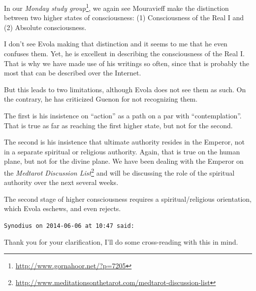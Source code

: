 \begin{footnotesize}
\begin{sffamily}
In our \textit{Monday study group}\footnote{\url{http://www.gornahoor.net/?p=7205}}, we again see Mouravieff make the distinction between two higher states of consciousness: (1) Consciousness of the Real I and (2) Absolute consciousness.

I don't see Evola making that distinction and it seems to me that he even confuses them. Yet, he is excellent in describing the consciousness of the Real I. That is why we have made use of his writings so often, since that is probably the most that can be described over the Internet.

But this leads to two limitations, although Evola does not see them as such. On the contrary, he has criticized Guenon for not recognizing them.

The first is his insistence on ``action'' as a path on a par with ``contemplation''. That is true as far as reaching the first higher state, but not for the second.

The second is his insistence that ultimate authority resides in the Emperor, not in a separate spiritual or religious authority. Again, that is true on the human plane, but not for the divine plane. We have been dealing with the Emperor on the \textit{Medtarot Discussion List}\footnote{\url{http://www.meditationsonthetarot.com/medtarot-discussion-list}} and will be discussing the role of the spiritual authority over the next several weeks.

The second stage of higher consciousness requires a spiritual/religious orientation, which Evola eschews, and even rejects.

\hfill

\texttt{Synodius on 2014-06-06 at 10:47 said:}

Thank you for your clarification, I'll do some cross-reading with this in mind.

\end{sffamily}
\end{footnotesize}

